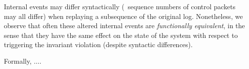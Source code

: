 Internal events may differ syntactically (\eg~sequence numbers
of control packets may all differ) when replaying a subsequence of the original log.
Nonetheless, we observe that often these altered internal events are {\em functionally
equivalent}, in the sense that they
have the same effect on the state of the system with respect to triggering the
invariant violation (despite syntactic differences).

Formally, $\dots$.
